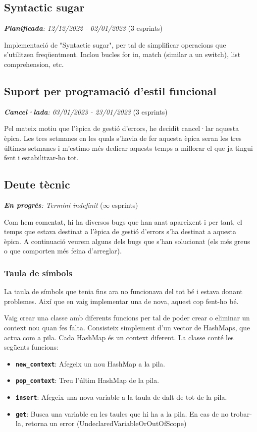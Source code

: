 ﻿\documentclass{article}
\begin{document}
\subsection{Syntactic sugar}
\textit{\textbf{Planificada}: 12/12/2022 - 02/01/2023} (3 esprints)

Implementació de "Syntactic sugar", per tal de simplificar operacions que
s'utilitzen freqüentment. Inclou bucles for in, match (similar a un switch),
list comprehension, etc.

\subsection{Suport per programació d'estil funcional}
\textit{\textbf{Cancel·lada}: 03/01/2023 - 23/01/2023} (3 esprints)

Pel mateix motiu que l'èpica de gestió d'errors, he decidit cancel·lar aquesta
èpica. Les tres setmanes en les quals s'havia de fer aquesta èpica seran les
tres últimes setmanes i m'estimo més dedicar aquests temps a millorar el que ja
tingui fent i estabilitzar-ho tot.

\subsection{Deute tècnic}
\textit{\textbf{En progrés}: Termini indefinit} ($\infty$ esprints)

Com hem comentat, hi ha diversos bugs que han anat apareixent i per tant, el
temps que estava destinat a l'èpica de gestió d'errors s'ha destinat a aquesta
èpica. A continuació veurem alguns dels bugs que s'han solucionat (els més
greus o que comporten més feina d'arreglar).

\subsubsection{Taula de símbols}

La taula de símbols que tenia fins ara no funcionava del tot bé i estava donant
problemes. Així que en vaig implementar una de nova, aquest cop fent-ho bé.

Vaig crear una classe amb diferents funcions per tal de poder crear o eliminar
un context nou quan fes falta. Consisteix simplement d'un vector de HashMaps,
que actua com a pila. Cada HashMap és un context diferent. La classe conté les
següents funcions:

\begin{itemize}
    \item \texttt{\textbf{new\_context}}: Afegeix un nou HashMap a la pila.
    \item \texttt{\textbf{pop\_context}}: Treu l'últim HashMap de la pila.
    \item \texttt{\textbf{insert}}: Afegeix una nova variable a la taula de dalt
    de tot de la pila.
    \item \texttt{\textbf{get}}: Busca una variable en les taules que hi ha a la
    pila. En cas de no trobar-la, retorna un error (UndeclaredVariableOrOutOfScope)
\end{itemize}
\end{document}
